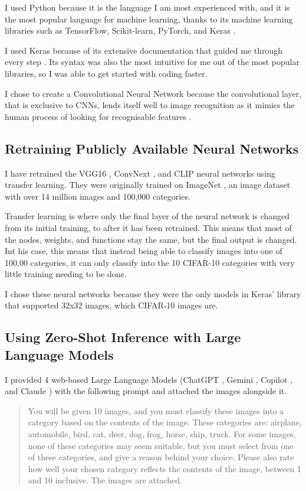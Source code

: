 \documentclass{article}
\begin{document}
I used Python because it is the language I am most experienced with, and it is the most popular language for machine learning, thanks to its machine learning libraries such as TensorFlow, Scikit-learn, PyTorch, and Keras \cite{overflow2022libraries,newhorizons2023pythonML}.


I used Keras because of its extensive documentation that guided me through every step \cite{kerasDocs}. Its syntax was also the most intuitive for me out of the most popular libraries, so I was able to get started with coding faster.


I chose to create a Convolutional Neural Network because the convolutional layer, that is exclusive to CNNs, lends itself well to image recognition as it mimics the human process of looking for recognisable features \cite{rawat2017CNN}.

\subsection{Retraining Publicly Available Neural Networks}
I have retrained the VGG16 \cite{simonyan2015deepconvolutionalnetworkslargescale}, ConvNext \cite{liu2022convnet2020s}, and CLIP \cite{radford2021learningtransferablevisualmodels} neural networks using transfer learning. They were originally trained on ImageNet \cite{ImageNet}, an image dataset with over 14 million images and 100,000 categories.

Transfer learning is where only the final layer of the neural network is changed from its initial training, to after it has been retrained. This means that most of the nodes, weights, and functions stay the same, but the final output is changed. Int his case, this means that instead being able to classify images into one of 100,00 categories, it can only classify into the 10 CIFAR-10 categories with very little training needing to be done.

I chose these neural networks because they were the only models in Keras' library that supported 32x32 images, which CIFAR-10 images are.


\subsection{Using Zero-Shot Inference with Large Language Models}
I provided 4 web-based Large Language Models (ChatGPT \cite{ChatGPT}, Gemini \cite{Gemini}, Copilot \cite{Copilot}, and Claude \cite{Claude}) with the following prompt and attached the images alongside it.
\begin{quote}
    You will be given 10 images, and you must classify these images into a category based on the contents of the image. These categories are: airplane, automobile, bird, cat, deer, dog, frog, horse, ship, truck. For some images, none of these categories may seem suitable, but you must select from one of these categories, and give a reason behind your choice. Please also rate how well your chosen category reflects the contents of the image, between 1 and 10 inclusive. The images are attached.
\end{quote}
\end{document}
